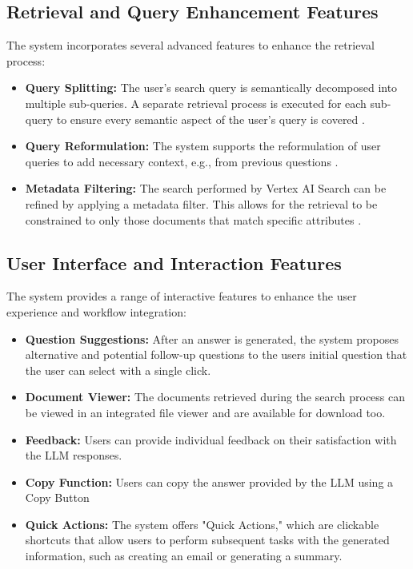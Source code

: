 \documentclass[
	english,
	ruledheaders=section,%
	class=report,%
	thesis={type=bachelor},%
	accentcolor=1b,%
	custommargins=true,%
	marginpar=false,%
	parskip=half-,%
	fontsize=11pt,%
	DIV=14,
]{tudapub}
\begin{document}
\subsection{Retrieval and Query Enhancement Features}
The system incorporates several advanced features to enhance the retrieval process:

\begin{itemize}
    \item \textbf{Query Splitting:} The user's search query is semantically decomposed into multiple sub-queries. A separate retrieval process is executed for each sub-query to ensure every semantic aspect of the user's query is covered \parencite[p.~8]{Ammann2025}.
    
    \item \textbf{Query Reformulation:} The system supports the reformulation of user queries to add necessary context, e.g., from previous questions \parencite[pp.~6--7]{Setty2024}.
    
    \item \textbf{Metadata Filtering:} The search performed by Vertex AI Search can be refined by applying a metadata filter. This allows for the retrieval to be constrained to only those documents that match specific attributes \parencite[pp.~7--8]{Setty2024}.
\end{itemize}

\subsection{User Interface and Interaction Features}
The system provides a range of interactive features to enhance the user experience and workflow integration:

\begin{itemize}
    \item \textbf{Question Suggestions:} After an answer is generated, the system proposes alternative and potential follow-up questions to the users initial question that the user can select with a single click.
    
    \item \textbf{Document Viewer:} The documents retrieved during the search process can be viewed in an integrated file viewer and are available for download too.
    
    \item \textbf{Feedback:} Users can provide individual feedback on their satisfaction with the LLM responses.

    \item \textbf{Copy Function:} Users can copy the answer provided by the LLM using a Copy Button
    
    \item \textbf{Quick Actions:} The system offers "Quick Actions," which are clickable shortcuts that allow users to perform subsequent tasks with the generated information, such as creating an email or generating a summary.
\end{itemize}
\end{document}
